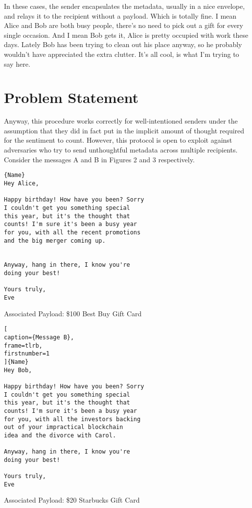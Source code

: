 \documentclass[
parskip=half
]{article}
\begin{document}
In these cases, the sender encapsulates the metadata, usually in a nice envelope, and relays it to the recipient without a payload. Which is totally fine. I mean Alice and Bob are both busy people, there’s no need to pick out a gift for every single occasion. And I mean Bob gets it, Alice is pretty occupied with work these days. Lately Bob has been trying to clean out his place anyway, so he probably wouldn't have appreciated the extra clutter. It’s all cool, is what I’m trying to say here.

\newpage

\section{Problem Statement}
Anyway, this procedure works correctly for well-intentioned senders under the assumption that they did in fact put in the implicit amount of thought required for the sentiment to count. However, this protocol is open to exploit against adversaries who try to send unthoughtful metadata across multiple recipients. Consider the messages A and B in Figures 2 and 3 respectively.

\noindent
\begin{minipage}{.45\textwidth}
\begin{lstlisting}[caption=Message A,frame=tlrb]{Name}
Hey Alice,

Happy birthday! How have you been? Sorry
I couldn't get you something special
this year, but it's the thought that
counts! I'm sure it's been a busy year 
for you, with all the recent promotions 
and the big merger coming up. 


Anyway, hang in there, I know you're
doing your best!

Yours truly,
Eve
\end{lstlisting}
Associated Payload: \$100 Best Buy Gift Card
\end{minipage}
\hfill
\noindent
\begin{minipage}{.45\textwidth}
\begin{lstlisting}[
caption={Message B},
frame=tlrb,
firstnumber=1
]{Name}
Hey Bob,

Happy birthday! How have you been? Sorry
I couldn't get you something special
this year, but it's the thought that
counts! I'm sure it's been a busy year 
for you, with all the investors backing 
out of your impractical blockchain 
idea and the divorce with Carol.

Anyway, hang in there, I know you're 
doing your best!

Yours truly,
Eve
\end{lstlisting}
Associated Payload: \$20 Starbucks Gift Card\footnotemark
\end{minipage}
\vspace{5mm}
\end{document}
